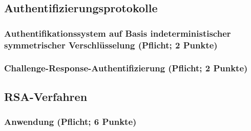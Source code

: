 \documentclass{article}
\begin{document}
\subsection{Authentifizierungsprotokolle}
\subsubsection{Authentifikationssystem auf Basis indeterministischer symmetrischer Verschlüsselung (Pflicht; 2 Punkte)}
\subsubsection{Challenge-Response-Authentifizierung (Pflicht; 2 Punkte) }


\subsection{RSA-Verfahren}
\subsubsection{Anwendung (Pflicht; 6 Punkte)}
\end{document}

